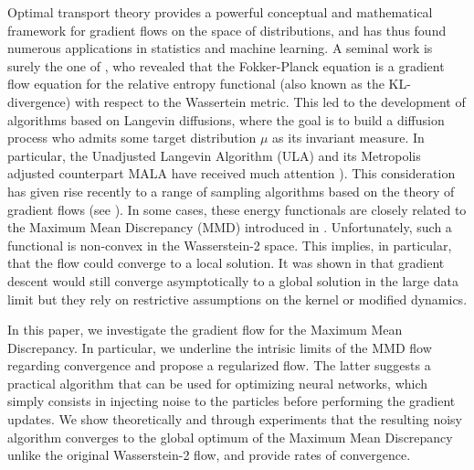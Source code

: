Optimal transport   theory provides a powerful conceptual and mathematical framework for gradient flows on the space of distributions, and has thus found numerous applications in statistics and machine learning. A seminal work is surely the one of \cite{jordan1998variational}, who revealed that the Fokker-Planck equation is a gradient
flow equation for the relative entropy functional (also known as the KL-divergence) with respect to the Wassertein metric. %
This led to the development of algorithms based on Langevin diffusions, where the goal is to build a diffusion process who admits some target distribution $\mu$ as its invariant measure. In particular, the Unadjusted
Langevin Algorithm (ULA) and its Metropolis adjusted counterpart MALA have received much
attention \cite{durmus2018analysis}). This consideration has given rise recently to a range of sampling
algorithms based on the theory of gradient flows (see \cite{liu2017stein, csimcsekli2018sliced, bernton2018langevin, mroueh2018regularized}). %
In some cases, these energy functionals are closely related to the Maximum Mean Discrepancy (MMD) introduced in \cite{gretton2012kernel}. Unfortunately, such a functional is non-convex in the Wasserstein-2 space. This implies, in particular, that the flow could converge to a local solution. It was shown in \cite{chizat2018global,rotskoff2019global} that gradient descent would still converge asymptotically to a global solution in the large data limit but they rely on %
restrictive assumptions on the kernel or modified dynamics. 

In this paper, we investigate the gradient flow for the Maximum Mean Discrepancy. In particular, we underline the intrisic limits of the MMD flow regarding convergence and propose a regularized flow. The latter suggests a practical algorithm that can be used for optimizing neural networks, which simply consists in injecting noise to the particles before performing the gradient updates. We show theoretically and through experiments that the resulting noisy algorithm converges to the global optimum of the Maximum Mean Discrepancy unlike the original Wasserstein-2 flow, and provide rates of convergence. 

